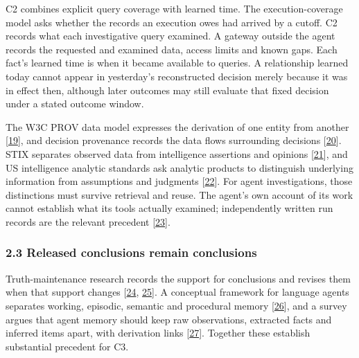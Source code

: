 \documentclass[
  11pt,
]{article}
\begin{document}
C2 combines explicit query coverage with learned time. The
execution-coverage model asks whether the records an execution owes had
arrived by a cutoff. C2 records what each investigative query examined.
A gateway outside the agent records the requested and examined data,
access limits and known gaps. Each fact's learned time is when it became
available to queries. A relationship learned today cannot appear in
yesterday's reconstructed decision merely because it was in effect then,
although later outcomes may still evaluate that fixed decision under a
stated outcome window.

The W3C PROV data model expresses the derivation of one entity from
another {[}\protect\hyperlink{ref-W3C2013PROVDM}{19}{]}, and decision
provenance records the data flows surrounding decisions
{[}\protect\hyperlink{ref-Singh2019DecisionProvenance}{20}{]}. STIX
separates observed data from intelligence assertions and opinions
{[}\protect\hyperlink{ref-OASIS2021STIX}{21}{]}, and US intelligence
analytic standards ask analytic products to distinguish underlying
information from assumptions and judgments
{[}\protect\hyperlink{ref-ODNI2015ICD203}{22}{]}. For agent
investigations, those distinctions must survive retrieval and reuse. The
agent's own account of its work cannot establish what its tools actually
examined; independently written run records are the relevant precedent
{[}\protect\hyperlink{ref-Dai2026Hearsay}{23}{]}.

\hypertarget{released-conclusions-remain-conclusions}{%
\subsubsection{2.3 Released conclusions remain
conclusions}\label{released-conclusions-remain-conclusions}}

Truth-maintenance research records the support for conclusions and
revises them when that support changes
{[}\protect\hyperlink{ref-Doyle1979TMS}{24},
\protect\hyperlink{ref-Malheiro1994BeliefRevision}{25}{]}. A conceptual
framework for language agents separates working, episodic, semantic and
procedural memory {[}\protect\hyperlink{ref-Sumers2024CoALA}{26}{]}, and
a survey argues that agent memory should keep raw observations,
extracted facts and inferred items apart, with derivation links
{[}\protect\hyperlink{ref-Wang2026AgentTraces}{27}{]}. Together these
establish substantial precedent for C3.
\end{document}

